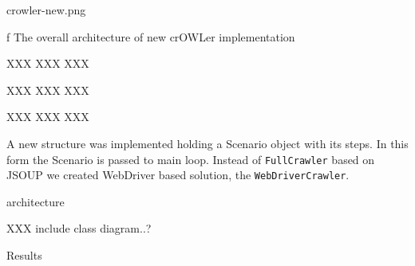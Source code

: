 \midinsert {}
\picw=12cm \cinspic crowler-new.png
\caption/f The overall architecture of new crOWLer implementation
\endinsert

XXX XXX XXX 

XXX XXX XXX 

XXX XXX XXX 

%

A new structure was implemented holding a Scenario object with its steps.  In
this form the Scenario is passed to main loop. Instead of {\tt FullCrawler}
based on JSOUP we created WebDriver based solution, the {\tt WebDriverCrawler}. 


\secc architecture

XXX include class diagram..?


%


\sec Results


